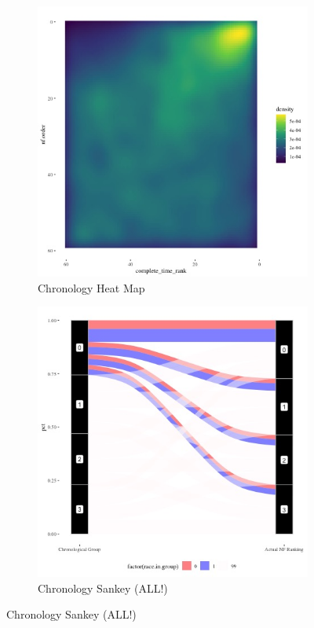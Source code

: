 \documentclass[12pt,letterpaper]{article}
\begin{document}
\begin{figure}[ht]

    \begin{subfigure}{.5\textwidth} %
        \centering
        \includegraphics[width=.9\linewidth]{Output/Graphs/Audit/Heatmaps/US NF chron rank by nf rank - smooth.jpg}  %
        \caption{Chronology Heat Map}
        \label{fig:sub-first}
        \end{subfigure}
    \begin{subfigure}{.5\textwidth}
        \centering
        \includegraphics[width=.9\linewidth]{Output/Graphs/Audit/Sankey flows/US NF chronology to actual by ingroup.jpg}  
        \caption{Chronology Sankey (ALL!)}
        \label{fig:sub-second}
    \end{subfigure}


\end{figure}
\end{document}
